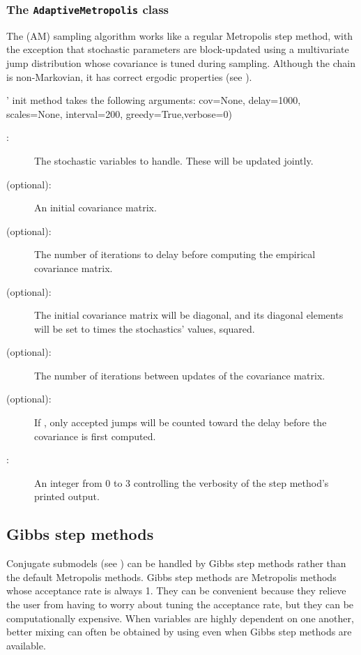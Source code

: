 \subsubsection{The \texttt{AdaptiveMetropolis} class} 
The  (AM) sampling algorithm works like a regular Metropolis step method, with the exception that stochastic parameters are block-updated using a multivariate jump distribution whose covariance is tuned during sampling. Although the chain is non-Markovian, it has correct ergodic properties (see \cite{Haario:2001lr}).

' init method takes the following arguments:
cov=None, delay=1000, scales=None, interval=200, greedy=True,verbose=0)
\begin{description}
   \item[:] The stochastic variables to handle. These will be updated jointly.
   \item[ (optional):] An initial covariance matrix.
   \item[ (optional):] The number of iterations to delay before computing the empirical covariance matrix.
   \item[ (optional):] The initial covariance matrix will be diagonal, and its diagonal elements will be set to  times the stochastics' values, squared.
   \item[ (optional):] The number of iterations between updates of the covariance matrix.
   \item[ (optional):] If , only accepted jumps will be counted toward the delay before the covariance is first computed.
   \item[:] An integer from 0 to 3 controlling the verbosity of the step method's printed output.   
\end{description}
 
\hypertarget{gibbs}{}
\subsection*{Gibbs step methods} \label{gibbs}

Conjugate submodels (see \cite{gelman}) can be handled by Gibbs step methods rather than the default Metropolis methods. Gibbs step methods are Metropolis methods whose acceptance rate is always 1. They can be convenient because they relieve the user from having to worry about tuning the acceptance rate, but they can be computationally expensive. When variables are highly dependent on one another, better mixing can often be obtained by using  even when Gibbs step methods are available.

